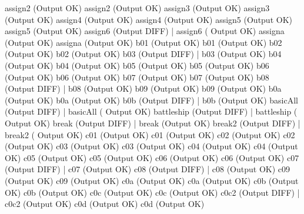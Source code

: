 \documentclass[12pt]{book}
\begin{document}
assign2 (Output OK)                                    assign2 (Output OK)
assign3 (Output OK)                                    assign3 (Output OK)
assign4 (Output OK)                                    assign4 (Output OK)
assign5 (Output OK)                                    assign5 (Output OK)
assign6 (Output DIFF)                                      |    assign6 (
Output OK)
assigna (Output OK)                                    assigna (Output OK)
b01 (Output OK)                                        b01 (Output OK)
b02 (Output OK)                                        b02 (Output OK)
b03 (Output DIFF)                                      |    b03 (Output OK)
b04 (Output OK)                                        b04 (Output OK)
b05 (Output OK)                                        b05 (Output OK)
b06 (Output OK)                                        b06 (Output OK)
b07 (Output OK)                                        b07 (Output OK)
b08 (Output DIFF)                                      |    b08 (Output OK)
b09 (Output OK)                                        b09 (Output OK)
b0a (Output OK)                                        b0a (Output OK)
b0b (Output DIFF)                                      |    b0b (Output OK)
basicAll (Output DIFF)                                      |    basicAll (
Output OK)
battleship (Output DIFF)                                  |    battleship (
Output OK)
break (Output DIFF)                                      |    break (Output 
OK)
break2 (Output DIFF)                                      |    break2 (
Output OK)
c01 (Output OK)                                        c01 (Output OK)
c02 (Output OK)                                        c02 (Output OK)
c03 (Output OK)                                        c03 (Output OK)
c04 (Output OK)                                        c04 (Output OK)
c05 (Output OK)                                        c05 (Output OK)
c06 (Output OK)                                        c06 (Output OK)
c07 (Output DIFF)                                      |    c07 (Output OK)
c08 (Output DIFF)                                      |    c08 (Output OK)
c09 (Output OK)                                        c09 (Output OK)
c0a (Output OK)                                        c0a (Output OK)
c0b (Output OK)                                        c0b (Output OK)
c0c (Output OK)                                        c0c (Output OK)
c0c2 (Output DIFF)                                      |    c0c2 (Output OK)
c0d (Output OK)                                        c0d (Output OK)
\end{document}
